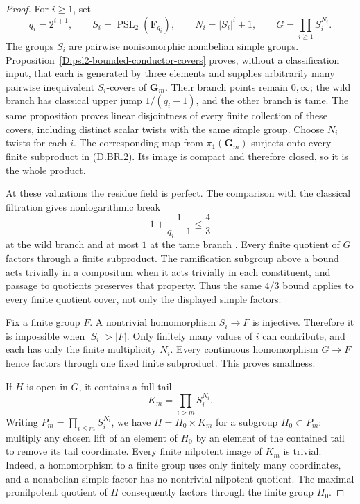 \begin{proof}
For $i\ge1$, set
\[
 q_i=2^{i+1},\qquad S_i=\operatorname{PSL}_2(\mathbf F_{q_i}),
 \qquad N_i=|S_i|^i+1,\qquad
                   G=\prod_{i\ge1} S_i^{N_i}.             \tag{D.BR.2}
\]
The groups $S_i$ are pairwise nonisomorphic nonabelian
simple groups.  Proposition~\ref{D:psl2-bounded-conductor-covers}
proves, without a classification input, that each is
generated by three elements and supplies arbitrarily many
pairwise inequivalent $S_i$-covers of $\mathbf G_m$.
Their branch points remain $0,\infty$; the wild branch
has classical upper jump $1/(q_i-1)$, and the other branch
is tame.  The same proposition proves linear disjointness
of every finite collection of these covers, including
distinct scalar twists with the same simple group.
Choose $N_i$ twists for each $i$.  The corresponding
map from $\pi_1(\mathbf G_m)$ surjects onto every finite
subproduct in (D.BR.2).  Its image is compact and therefore
closed, so it is the whole product.

At these valuations the residue field is perfect.
The comparison with the classical filtration gives
nonlogarithmic break
\[
                       1+\frac1{q_i-1}\le\frac43
\]
at the wild branch and at most $1$ at the tame branch
\citep[Proposition~3.15(4), preprint p.~8]{AbbesSaito2002D}.
Every finite quotient of $G$ factors through a finite
subproduct.  The ramification subgroup above a bound
acts trivially in a compositum when it acts trivially
in each constituent, and passage to quotients preserves
that property.  Thus the same $4/3$ bound applies to
every finite quotient cover, not only the displayed
simple factors.

Fix a finite group $F$.  A nontrivial homomorphism
$S_i\to F$ is injective.  Therefore it is impossible
when $|S_i|>|F|$.  Only finitely many values of $i$ can
contribute, and each has only the finite multiplicity
$N_i$.  Every continuous homomorphism $G\to F$ hence
factors through one fixed finite subproduct.  This proves
smallness.

If $H$ is open in $G$, it contains a full tail
\[
                     K_m=\prod_{i>m}S_i^{N_i}.
\]
Writing $P_m=\prod_{i\le m}S_i^{N_i}$, we have
$H=H_0\times K_m$ for a subgroup $H_0\subset P_m$:
multiply any chosen lift of an element of $H_0$ by
an element of the contained tail to remove its tail
coordinate.  Every finite nilpotent image of $K_m$
is trivial.  Indeed, a homomorphism to a finite group
uses only finitely many coordinates, and a nonabelian
simple factor has no nontrivial nilpotent quotient.
The maximal pronilpotent quotient of $H$ consequently
factors through the finite group $H_0$.


\end{proof}
